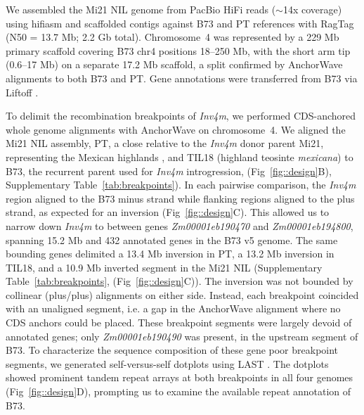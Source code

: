 \documentclass[9pt,twocolumn,twoside]{rilabRxiv}
\newcommand{\mex}{\textit{mexicana}\xspace}
\newcommand{\invfour}{\textit{Inv4m}\xspace}
\begin{document}
We assembled the Mi21 NIL genome from PacBio HiFi reads ($\sim$14x coverage) using hifiasm \cite{cheng2021} and scaffolded contigs against B73 and PT references with RagTag \cite{alonge2022} (N50 = 13.7 Mb; 2.2 Gb total).
Chromosome~4 was represented by a 229 Mb primary scaffold covering B73 chr4 positions 18--250 Mb, with the short arm tip (0.6--17 Mb) on a separate 17.2 Mb scaffold, a split confirmed by AnchorWave \cite{song2022} alignments to both B73 and PT.
Gene annotations were transferred from B73 via Liftoff \cite{shumate2021}.

To delimit the recombination breakpoints of \invfour, we performed CDS-anchored whole genome alignments with AnchorWave \cite{song2022} on chromosome~4.
We aligned the Mi21 NIL assembly, PT, a close relative to the \invfour donor parent Mi21, representing the Mexican highlands \citep{perez-limon2022, Vielle-Calzada2009-fp},  and TIL18 (highland teosinte \mex) to B73, the recurrent parent used for \invfour introgression, (Fig~\ref{fig::design}B), Supplementary Table~\ref{tab:breakpoints}).
In each pairwise comparison, the \invfour region aligned to the B73 minus strand while flanking regions aligned to the plus strand, as expected for an inversion (Fig~\ref{fig::design}C).
This allowed us to narrow down \invfour to between genes \textit{Zm00001eb190470} and \textit{Zm00001eb194800}, spanning 15.2 Mb and 432 annotated genes in the B73 v5 genome.
The same bounding genes delimited a 13.4 Mb inversion in PT, a 13.2 Mb inversion in TIL18, and a 10.9 Mb inverted segment in the Mi21 NIL (Supplementary Table~\ref{tab:breakpoints}, (Fig~\ref{fig::design}C)).
The inversion was not bounded by collinear (plus/plus) alignments on either side.
Instead, each breakpoint coincided with an unaligned segment, i.e. a gap in the AnchorWave alignment where no CDS anchors could be placed.
These breakpoint segments were largely devoid of annotated genes; only \textit{Zm00001eb190490} was present, in the upstream segment of B73.
To characterize the sequence composition of these gene poor breakpoint segments, we generated self-versus-self dotplots using LAST \cite{kielbasa2011}.
The dotplots showed prominent tandem repeat arrays at both breakpoints in all four genomes (Fig~\ref{fig::design}D), prompting us to examine the available repeat annotation of B73.
\end{document}
